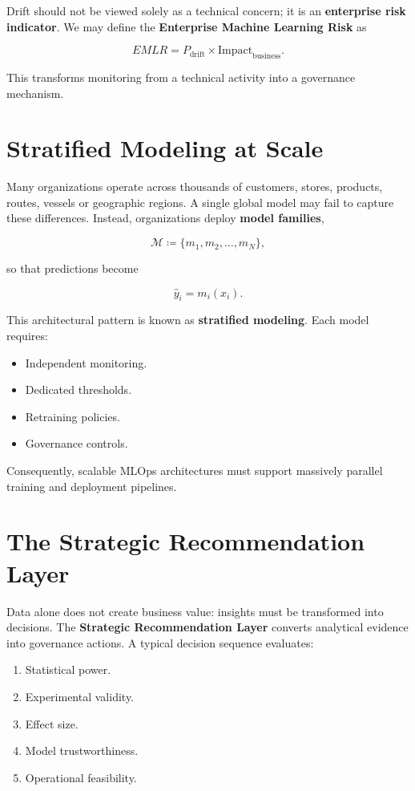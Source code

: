 \documentclass[
  a4paper,
  DIV=11,
  numbers=noendperiod]{scrartcl}
\providecommand{\tightlist}{%
  \setlength{\itemsep}{0pt}\setlength{\parskip}{0pt}}
\begin{document}
Drift should not be viewed solely as a technical concern; it is an
\textbf{enterprise risk indicator}. We may define the \textbf{Enterprise
Machine Learning Risk} as

\[
EMLR = P_{\text{drift}} \times \text{Impact}_{\text{business}}.
\]

This transforms monitoring from a technical activity into a governance
mechanism.

\section{Stratified Modeling at
Scale}\label{stratified-modeling-at-scale}

Many organizations operate across thousands of customers, stores,
products, routes, vessels or geographic regions. A single global model
may fail to capture these differences. Instead, organizations deploy
\textbf{model families},

\[
\mathcal{M} \coloneqq \{m_1, m_2, \ldots, m_N\},
\]

so that predictions become

\[
\hat{y}_i = m_i(x_i).
\]

This architectural pattern is known as \textbf{stratified modeling}.
Each model requires:

\begin{itemize}
\tightlist
\item
  Independent monitoring.
\item
  Dedicated thresholds.
\item
  Retraining policies.
\item
  Governance controls.
\end{itemize}

Consequently, scalable MLOps architectures must support massively
parallel training and deployment pipelines.

\section{The Strategic Recommendation
Layer}\label{the-strategic-recommendation-layer}

Data alone does not create business value: insights must be transformed
into decisions. The \textbf{Strategic Recommendation Layer} converts
analytical evidence into governance actions. A typical decision sequence
evaluates:

\begin{enumerate}
\def\labelenumi{\arabic{enumi}.}
\tightlist
\item
  Statistical power.
\item
  Experimental validity.
\item
  Effect size.
\item
  Model trustworthiness.
\item
  Operational feasibility.
\end{enumerate}
\end{document}
